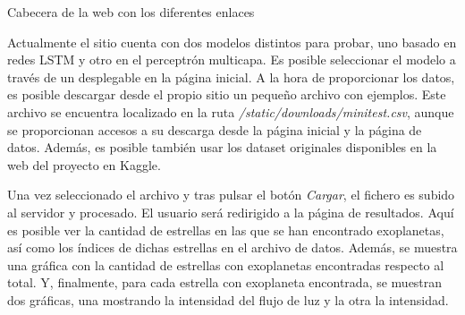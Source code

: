  {Cabecera de la web con los diferentes enlaces}

Actualmente el sitio cuenta con dos modelos distintos para probar, uno basado en redes LSTM y otro en el perceptrón multicapa. Es posible seleccionar el modelo a través de un desplegable en la página inicial. A la hora de proporcionar los datos, es posible descargar desde el propio sitio un pequeño archivo con ejemplos. Este archivo se encuentra localizado en la ruta \textit{/static/downloads/minitest.csv}, aunque se proporcionan accesos a su descarga desde la página inicial y la página de datos. Además, es posible también usar los dataset originales disponibles en la web del proyecto\cite{Kaggle-exoplanet} en Kaggle.


Una vez seleccionado el archivo y tras pulsar el botón \textit{Cargar}, el fichero es subido al servidor y procesado. El usuario será redirigido a la página de resultados. Aquí es posible ver la cantidad de estrellas en las que se han encontrado exoplanetas, así como los índices de dichas estrellas en el archivo de datos. Además, se muestra una gráfica con la cantidad de estrellas con exoplanetas encontradas respecto al total. Y, finalmente, para cada estrella con exoplaneta encontrada, se muestran dos gráficas, una mostrando la intensidad del flujo de luz y la otra la intensidad.

